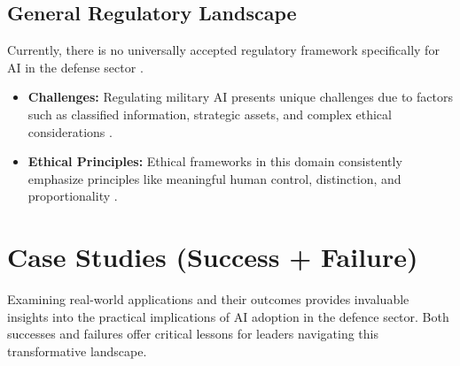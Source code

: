 \subsection{General Regulatory Landscape}
Currently, there is no universally accepted regulatory framework specifically for AI in the defense sector \cite{DCAF_Regulatory}.
\begin{itemize}
    \item \textbf{Challenges:} Regulating military AI presents unique challenges due to factors such as classified information, strategic assets, and complex ethical considerations \cite{DCAF_Regulatory}. 
    \item \textbf{Ethical Principles:} Ethical frameworks in this domain consistently emphasize principles like meaningful human control, distinction, and proportionality \cite{OsborneClarke_Regulatory}. 
\end{itemize}

\section{Case Studies (Success + Failure)}

Examining real-world applications and their outcomes provides invaluable insights into the practical implications of AI adoption in the defence sector. Both successes and failures offer critical lessons for leaders navigating this transformative landscape.


